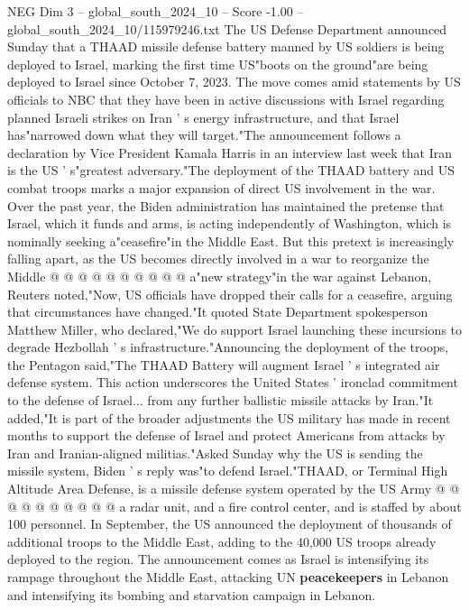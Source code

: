 \begin{textsample}{NEG Dim 3 – global\_south\_2024\_10 – Score -1.00 – global\_south\_2024\_10/115979246.txt}  \label{ex:f3_neg_055}
The US Defense Department announced Sunday that a THAAD missile defense battery manned by US soldiers is being deployed to Israel, marking the first time US"boots on the ground"are being deployed to Israel since October 7, 2023.
The move comes amid statements by US officials to NBC that they have been in active discussions with Israel regarding planned Israeli strikes on Iran ' s energy infrastructure, and that Israel has"narrowed down what they will target."The announcement follows a declaration by Vice President Kamala Harris in an interview last week that Iran is the US ' s"greatest adversary."The deployment of the THAAD battery and US combat troops marks a major expansion of direct US involvement in the war.
Over the past year, the Biden administration has maintained the pretense that Israel, which it funds and arms, is acting independently of Washington, which is nominally seeking a"ceasefire"in the Middle East.
But this pretext is increasingly falling apart, as the US becomes directly involved in a war to reorganize the Middle @ @ @ @ @ @ @ @ @ @ a"new strategy"in the war against Lebanon, Reuters noted,"Now, US officials have dropped their calls for a ceasefire, arguing that circumstances have changed."It quoted State Department spokesperson Matthew Miller, who declared,"We do support Israel launching these incursions to degrade Hezbollah ' s infrastructure."Announcing the deployment of the troops, the Pentagon said,"The THAAD Battery will augment Israel ' s integrated air defense system.
This action underscores the United States ' ironclad commitment to the defense of Israel... from any further ballistic missile attacks by Iran."It added,"It is part of the broader adjustments the US military has made in recent months to support the defense of Israel and protect Americans from attacks by Iran and Iranian-aligned militias."Asked Sunday why the US is sending the missile system, Biden ' s reply was"to defend Israel."THAAD, or Terminal High Altitude Area Defense, is a missile defense system operated by the US Army @ @ @ @ @ @ @ @ @ @ a radar unit, and a fire control center, and is staffed by about 100 personnel.
In September, the US announced the deployment of thousands of additional troops to the Middle East, adding to the 40,000 US troops already deployed to the region.
The announcement comes as Israel is intensifying its rampage throughout the Middle East, attacking UN \textbf{peacekeepers} in Lebanon and intensifying its bombing and starvation campaign in Lebanon.

\end{textsample}
